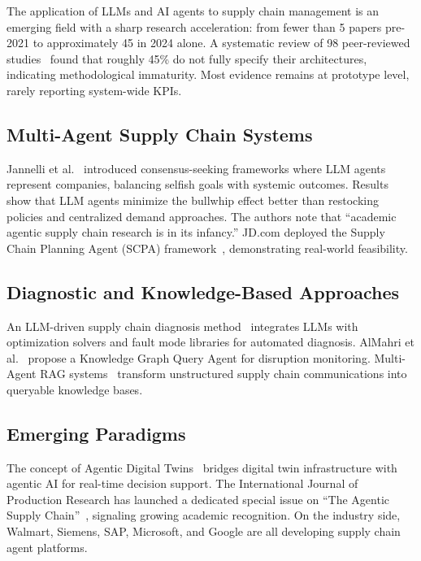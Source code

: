 \documentclass[12pt,a4paper]{report}
\begin{document}
The application of LLMs and AI agents to supply chain management is an emerging field with a sharp research acceleration: from fewer than 5 papers pre-2021 to approximately 45 in 2024 alone. A systematic review of 98 peer-reviewed studies~\cite{gaisc2025systematic} found that roughly 45\% do not fully specify their architectures, indicating methodological immaturity. Most evidence remains at prototype level, rarely reporting system-wide KPIs.

\subsection{Multi-Agent Supply Chain Systems}

Jannelli et al.~\cite{jannelli2024agentic} introduced consensus-seeking frameworks where LLM agents represent companies, balancing selfish goals with systemic outcomes. Results show that LLM agents minimize the bullwhip effect better than restocking policies and centralized demand approaches. The authors note that ``academic agentic supply chain research is in its infancy.'' JD.com deployed the Supply Chain Planning Agent (SCPA) framework~\cite{yin2025scpa}, demonstrating real-world feasibility.

\subsection{Diagnostic and Knowledge-Based Approaches}

An LLM-driven supply chain diagnosis method~\cite{scddiagnosis2025} integrates LLMs with optimization solvers and fault mode libraries for automated diagnosis. AlMahri et al.~\cite{almahri2026disruption} propose a Knowledge Graph Query Agent for disruption monitoring. Multi-Agent RAG systems~\cite{zhang2025rag} transform unstructured supply chain communications into queryable knowledge bases.

\subsection{Emerging Paradigms}

The concept of Agentic Digital Twins~\cite{agenticdt2026} bridges digital twin infrastructure with agentic AI for real-time decision support. The International Journal of Production Research has launched a dedicated special issue on ``The Agentic Supply Chain''~\cite{agenticscissue}, signaling growing academic recognition. On the industry side, Walmart, Siemens, SAP, Microsoft, and Google are all developing supply chain agent platforms.
\end{document}
